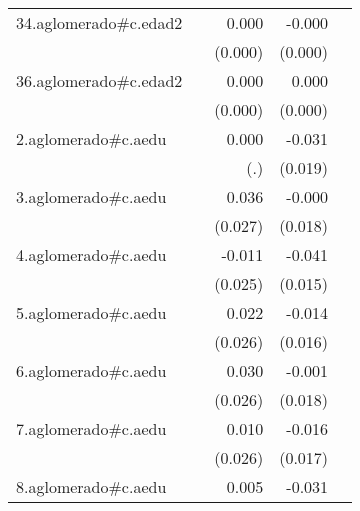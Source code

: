 {\begin{longtable}{l*{4}{D{.}{.}{-1}}}
\addlinespace
34.aglomerado#c.edad2&                     &       0.000         &      -0.000\sym{**} &                     \\
            &                     &     (0.000)         &     (0.000)         &                     \\
\addlinespace
36.aglomerado#c.edad2&                     &       0.000\sym{*}  &       0.000         &                     \\
            &                     &     (0.000)         &     (0.000)         &                     \\
\addlinespace
2.aglomerado#c.aedu&                     &       0.000         &      -0.031         &                     \\
            &                     &         (.)         &     (0.019)         &                     \\
\addlinespace
3.aglomerado#c.aedu&                     &       0.036         &      -0.000         &                     \\
            &                     &     (0.027)         &     (0.018)         &                     \\
\addlinespace
4.aglomerado#c.aedu&                     &      -0.011         &      -0.041\sym{**} &                     \\
            &                     &     (0.025)         &     (0.015)         &                     \\
\addlinespace
5.aglomerado#c.aedu&                     &       0.022         &      -0.014         &                     \\
            &                     &     (0.026)         &     (0.016)         &                     \\
\addlinespace
6.aglomerado#c.aedu&                     &       0.030         &      -0.001         &                     \\
            &                     &     (0.026)         &     (0.018)         &                     \\
\addlinespace
7.aglomerado#c.aedu&                     &       0.010         &      -0.016         &                     \\
            &                     &     (0.026)         &     (0.017)         &                     \\
\addlinespace
8.aglomerado#c.aedu&                     &       0.005         &      -0.031         &                     \\

\end{longtable}}
